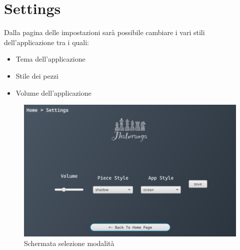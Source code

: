 \documentclass[a4paper,12pt]{report}
\begin{document}
\section{Settings}
Dalla pagina delle impostazioni sarà possibile cambiare i vari stili dell'applicazione tra i quali:
\begin{itemize}
    \item Tema dell'applicazione
    \item Stile dei pezzi
    \item Volume dell'applicazione
\end{itemize}
\begin{figure}[H]
    \begin{center}
        \centering
        \includegraphics[scale=0.4]{img/guidaUtente/settings.png}
    \end{center}
    \caption{Schermata selezione modalità}
    \label{img:guidaSettings}
\end{figure}
\end{document}
